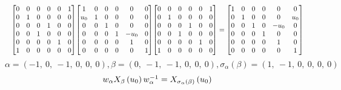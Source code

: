 \documentclass[11pt]{article}
\theoremstyle{definition}
\begin{document}
\[
\scaletoalign{\textwidth}{{\left[\begin{matrix}0 & 0 & 0 & 0 & 0 & 1\\0 & 1 & 0 & 0 & 0 & 0\\0 & 0 & 0 & 1 & 0 & 0\\0 & 0 & 1 & 0 & 0 & 0\\0 & 0 & 0 & 0 & 1 & 0\\1 & 0 & 0 & 0 & 0 & 0\end{matrix}\right]} {\left[\begin{matrix}1 & 0 & 0 & 0 & 0 & 0\\u_{0} & 1 & 0 & 0 & 0 & 0\\0 & 0 & 1 & 0 & 0 & 0\\0 & 0 & 0 & 1 & - u_{0} & 0\\0 & 0 & 0 & 0 & 1 & 0\\0 & 0 & 0 & 0 & 0 & 1\end{matrix}\right]} {\left[\begin{matrix}0 & 0 & 0 & 0 & 0 & 1\\0 & 1 & 0 & 0 & 0 & 0\\0 & 0 & 0 & 1 & 0 & 0\\0 & 0 & 1 & 0 & 0 & 0\\0 & 0 & 0 & 0 & 1 & 0\\1 & 0 & 0 & 0 & 0 & 0\end{matrix}\right]} = {\left[\begin{matrix}1 & 0 & 0 & 0 & 0 & 0\\0 & 1 & 0 & 0 & 0 & u_{0}\\0 & 0 & 1 & 0 & - u_{0} & 0\\0 & 0 & 0 & 1 & 0 & 0\\0 & 0 & 0 & 0 & 1 & 0\\0 & 0 & 0 & 0 & 0 & 1\end{matrix}\right]}}
\]
\[
\alpha = \left( -1, \  0, \  -1, \  0, \  0, \  0\right), \beta = \left( 0, \  -1, \  -1, \  0, \  0, \  0\right), \sigma_{\alpha}(\beta) = \left( 1, \  -1, \  0, \  0, \  0, \  0\right)
\]
\[
\scaletoalign{\textwidth}{w_{\alpha} X_{\beta}\left(u_{0}\right) w_{\alpha}^{-1} = X_{\sigma_{\alpha}\left(\beta\right)}\left(u_{0}\right)}
\]
\end{document}
